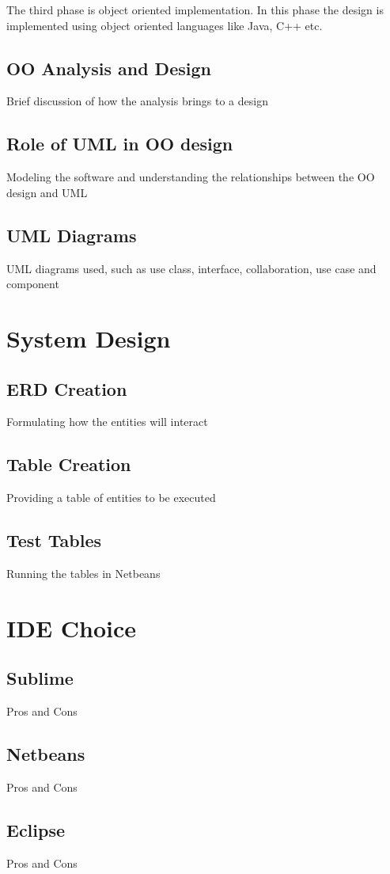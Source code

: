     The third phase is object oriented implementation. In this phase the design is implemented using object oriented languages like Java, C++ etc.

\subsection{OO Analysis and Design}
Brief discussion of how the analysis brings to a design
\subsection{Role of UML in OO design}
Modeling the software and understanding the relationships between the OO design and UML
\subsection{UML Diagrams}
UML diagrams used, such as use class, interface, collaboration, use case and component


\section{System Design}

\subsection{ERD Creation}
Formulating how the entities will interact
\subsection{Table Creation}
Providing a table of entities to be executed
\subsection{Test Tables}
Running the tables in Netbeans

\section{IDE Choice}

\subsection{Sublime}
Pros and Cons
\subsection{Netbeans}
Pros and Cons
\subsection{Eclipse}
Pros and Cons


